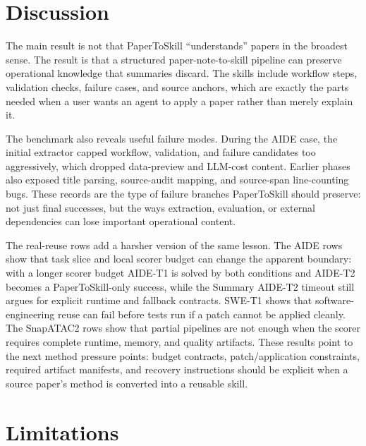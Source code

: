 \section{Discussion}

The main result is not that PaperToSkill ``understands'' papers in the broadest
sense. The result is that a structured paper-note-to-skill pipeline can preserve
operational knowledge that summaries discard. The skills include workflow
steps, validation checks, failure cases, and source anchors, which are exactly
the parts needed when a user wants an agent to apply a paper rather than merely
explain it.

The benchmark also reveals useful failure modes. During the AIDE case, the
initial extractor capped workflow, validation, and failure candidates too
aggressively, which dropped data-preview and LLM-cost content. Earlier phases
also exposed title parsing, source-audit mapping, and source-span line-counting
bugs. These records are the type of failure branches PaperToSkill should
preserve: not just final successes, but the ways extraction, evaluation, or
external dependencies can lose important operational content.

The real-reuse rows add a harsher version of the same lesson. The AIDE rows
show that task slice and local scorer budget can change the apparent boundary:
with a longer scorer budget AIDE-T1 is solved by both conditions and AIDE-T2
becomes a PaperToSkill-only success, while the Summary AIDE-T2 timeout still
argues for explicit runtime and fallback contracts. SWE-T1 shows that
software-engineering reuse can fail before tests run if a patch cannot be
applied cleanly. The SnapATAC2 rows show that partial pipelines are not enough
when the scorer requires complete runtime, memory, and quality artifacts. These
results point to the next method pressure points: budget contracts,
patch/application constraints, required artifact manifests, and recovery
instructions should be explicit when a source paper's method is converted into
a reusable skill.

\section{Limitations}

